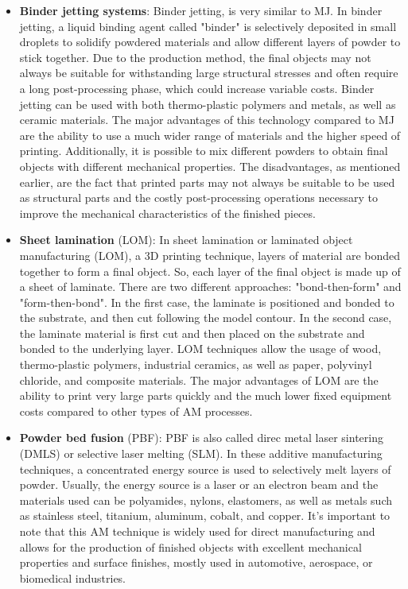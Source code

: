 \begin{itemize}
    \item \textbf{Binder jetting systems}: Binder jetting, is very similar to MJ. In binder jetting, a liquid binding agent called "binder" is selectively deposited in small droplets to solidify powdered materials and allow different layers of powder to stick together. Due to the production method, the final objects may not always be suitable for withstanding large structural stresses and often require a long post-processing phase, which could increase variable costs. Binder jetting can be used with both thermo-plastic polymers and metals, as well as ceramic materials. The major advantages of this technology compared to MJ are the ability to use a much wider range of materials and the higher speed of printing. Additionally, it is possible to mix different powders to obtain final objects with different mechanical properties. The disadvantages, as mentioned earlier, are the fact that printed parts may not always be suitable to be used as structural parts and the costly post-processing operations necessary to improve the mechanical characteristics of the finished pieces.
    \item \textbf{Sheet lamination} (LOM): In sheet lamination or laminated object manufacturing (LOM), a 3D printing technique, layers of material are bonded together to form a final object. So, each layer of the final object is made up of a sheet of laminate. There are two different approaches: "bond-then-form" and "form-then-bond". In the first case, the laminate is positioned and bonded to the substrate, and then cut following the model contour. In the second case, the laminate material is first cut and then placed on the substrate and bonded to the underlying layer. LOM techniques allow the usage of wood, thermo-plastic polymers, industrial ceramics, as well as paper, polyvinyl chloride, and composite materials. The major advantages of LOM are the ability to print very large parts quickly and the much lower fixed equipment costs compared to other types of AM processes.
    \item \textbf{Powder bed fusion} (PBF): PBF is also called direc metal laser sintering (DMLS) or selective laser melting (SLM). In these additive manufacturing techniques, a concentrated energy source is used to selectively melt layers of powder. Usually, the energy source is a laser or an electron beam and the materials used can be polyamides, nylons, elastomers, as well as metals such as stainless steel, titanium, aluminum, cobalt, and copper. It's important to note that this AM technique is widely used for direct manufacturing and allows for the production of finished objects with excellent mechanical properties and surface finishes, mostly used in automotive, aerospace, or biomedical industries.

\end{itemize}

